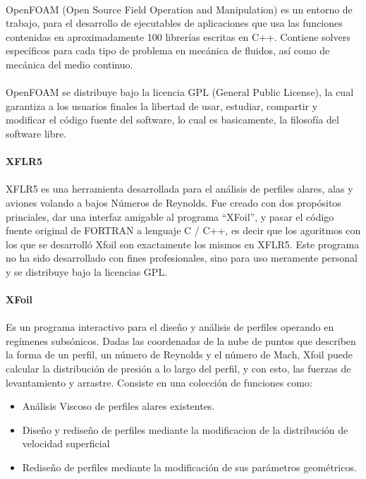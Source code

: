 \documentclass[letterpaper, openright, 12pt]{book}
\begin{document}
				\paragraph*{}
					OpenFOAM (Open Source Field Operation and Manipulation) es un entorno de trabajo, para el desarrollo de ejecutables de aplicaciones que usa las funciones contenidas en aproximadamente 100 librerías escritas en C++. Contiene solvers específicos para cada tipo de problema en mecánica de fluidos, así como de mecánica del medio continuo.\cite{openfoam}
				\paragraph*{}
					OpenFOAM se distribuye bajo la licencia GPL (General Public License), la cual garantiza a los usuarios finales la libertad de usar, estudiar, compartir y modificar el código fuente del software, lo cual es basicamente, la filosofía del software libre.
					
				\paragraph*{XFLR5}
				\paragraph*{}
					XFLR5 es una herramienta desarrollada para el análisis de perfiles alares, alas y aviones volando a bajos Números de Reynolds. Fue creado con dos propósitos princiales, dar una interfaz amigable al programa ``XFoil'', y pasar el código fuente original de FORTRAN a lenguaje C / C++, es decir que los agoritmos con los que se desarrolló Xfoil son exactamente los mismos en XFLR5.\cite{xflr5} Este programa no ha sido desarrollado con fines profesionales, sino para uso meramente personal y se distribuye bajo la licencias GPL.
					
				\paragraph*{XFoil}
				\paragraph*{}
					Es un programa interactivo para el diseño y análisis de perfiles operando en regímenes subsónicos. Dadas las coordenadas de la nube de puntos que describen la forma de un perfil, un número de Reynolds y el número de Mach, Xfoil puede calcular la distribución de presión a lo largo del perfil, y con esto, las fuerzas de levantamiento y arrastre.
					Consiste en una colección de funciones como:
					\begin{itemize}
						\item Análisis Viscoso de perfiles alares existentes.
						\item Diseño y rediseño de perfiles mediante la modificacion de la distribución de velocidad superficial
						\item Rediseño de perfiles mediante la modificación de sus parámetros geométricos.
					\end{itemize}
				\cite{xfoil}
\end{document}
